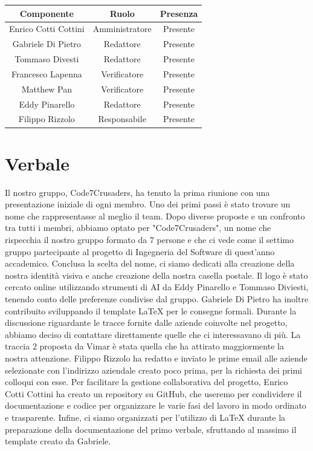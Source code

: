 \documentclass{article}
\begin{document}
\begin{tabular}{|c|c|c|}
    \hline
    \textbf{Componente} & \textbf{Ruolo} & \textbf{Presenza}\\
    \hline
    Enrico Cotti Cottini & Amministratore & Presente \\ 
    \hline
    Gabriele Di Pietro & Redattore & Presente \\ 
    \hline
    Tommaso Divesti & Redattore & Presente \\ 
    \hline %
    Francesco Lapenna & Verificatore & Presente \\ 
    \hline
    Matthew Pan & Verificatore & Presente \\ 
    \hline %
    Eddy Pinarello & Redattore & Presente \\ 
    \hline %
    Filippo Rizzolo & Responsabile & Presente \\ 
    \hline %
\end{tabular}



\newpage
\section{Verbale}

\label{sec:verbale}
{\Large
Il nostro gruppo, Code7Crusaders, ha tenuto la prima riunione con una presentazione iniziale di ogni membro. Uno dei primi passi è stato trovare un nome che rappresentasse al meglio il team. Dopo diverse proposte e un confronto tra tutti i membri, abbiamo optato per "Code7Crusaders", un nome che rispecchia il nostro gruppo formato da 7 persone e che ci vede come il settimo gruppo partecipante al progetto di Ingegneria del Software di quest’anno accademico.\newline
Conclusa la scelta del nome, ci siamo dedicati alla creazione della nostra identità visiva e anche creazione della nostra casella postale. Il logo è stato cercato online utilizzando strumenti di AI da Eddy Pinarello e Tommaso Diviesti, tenendo conto delle preferenze condivise dal gruppo. Gabriele Di Pietro ha inoltre contribuito sviluppando il template LaTeX per le consegne formali.\newline
Durante la discussione riguardante le tracce fornite dalle aziende coinvolte nel progetto, abbiamo deciso di contattare direttamente quelle che ci interessavano di più. La traccia 2 proposta da Vimar è stata quella che ha attirato maggiormente la nostra attenzione. Filippo Rizzolo ha redatto e inviato le prime email alle aziende selezionate con l'indirizzo aziendale creato poco prima, per la richiesta dei primi colloqui con esse.\newline
Per facilitare la gestione collaborativa del progetto, Enrico Cotti Cottini ha creato un repository su GitHub, che useremo per condividere il documentazione e codice per organizzare le varie fasi del lavoro in modo ordinato e trasparente. \newline
Infine, ci siamo organizzati per l'utilizzo di LaTeX durante la preparazione della documentazione del primo verbale, sfruttando al massimo il template creato da Gabriele.}
\end{document}
